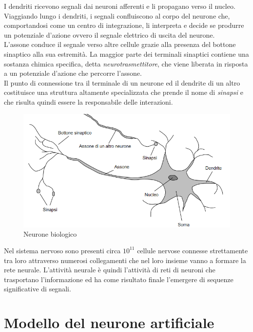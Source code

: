 \documentclass[12pt,a4paper,oneside]{book}
\begin{document}
		I dendriti ricevono segnali dai neuroni afferenti e li propagano verso il nucleo. Viaggiando lungo i dendriti, i segnali confluiscono al corpo del neurone che, comportandosi come un centro di integrazione, li interpreta e decide se produrre un potenziale d'azione ovvero il segnale elettrico di uscita del neurone.\\ 
		L'assone conduce il segnale verso altre cellule grazie alla presenza del bottone sinaptico alla sua estremità.
		La maggior parte dei terminali sinaptici contiene una sostanza chimica specifica, detta \emph{neurotrasmettitore}, che viene liberata in risposta a un potenziale d'azione che percorre l'assone.\\
		Il punto di connessione tra il terminale di un neurone ed il dendrite di un altro costituisce una struttura altamente specializzata che prende il nome di \emph{sinapsi} e che risulta quindi essere la responsabile delle interazioni.\\ 
		 
		  \begin{figure}[h]
		 	\centering
		 	\includegraphics[width=0.7\linewidth]{IMMAGINI/neuron}
		 	\caption{Neurone biologico}
		 	\label{fig:neuron}
		 \end{figure}
		 
	 	 Nel sistema nervoso sono presenti circa $10^{11}$ cellule nervose connesse strettamente tra loro attraverso numerosi collegamenti che nel loro insieme vanno a formare la rete neurale. L'attività neurale è quindi l'attività di reti di neuroni che trasportano l'informazione ed ha come risultato finale l'emergere di sequenze significative di segnali.\\
	 	
	 	
	 	
	 	
		 
	\section{Modello del neurone artificiale}
		
\end{document}
